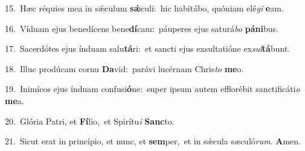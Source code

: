 {\numbfont\textcolor{\numbcolor}{15.}}~Hæc réquies mea in sǽculum \textbf{sǽ}\-culi:~\star hic habitábo, quóniam elé\textit{gi} \textbf{e}\-am.\par
{\numbfont\textcolor{\numbcolor}{16.}}~Víduam ejus benedícens bene\-\textbf{dí}\-cam:~\star páuperes ejus saturá\textit{bo} \textbf{pá}\-\textbf{ni}bus.\par
{\numbfont\textcolor{\numbcolor}{17.}}~Sacerdótes ejus índuam salu\-\textbf{tá}\-ri:~\star et sancti ejus exsultatióne ex\-\textit{sul}\-\textbf{tá}bunt.\par
{\numbfont\textcolor{\numbcolor}{18.}}~Illuc prodúcam cornu \textbf{Da}\-vid:~\star parávi lucérnam Chris\textit{to} \textbf{me}\-o.\par
{\numbfont\textcolor{\numbcolor}{19.}}~Inimícos ejus índuam confusi\-\textbf{ó}\-ne:~\star super ipsum autem efflorébit sanctificáti\textit{o} \textbf{me}\-a.\par
{\numbfont\textcolor{\numbcolor}{20.}}~Glória Patri, et \textbf{Fí}\-lio,~\star et Spirítu\textit{i} \textbf{Sanc}\-to.\par
{\numbfont\textcolor{\numbcolor}{21.}}~Sicut erat in princípio, et nunc, et \textbf{sem}\-per,~\star et in sǽcula sæculó\-\textit{rum}\-. \textbf{A}\-men.\par

